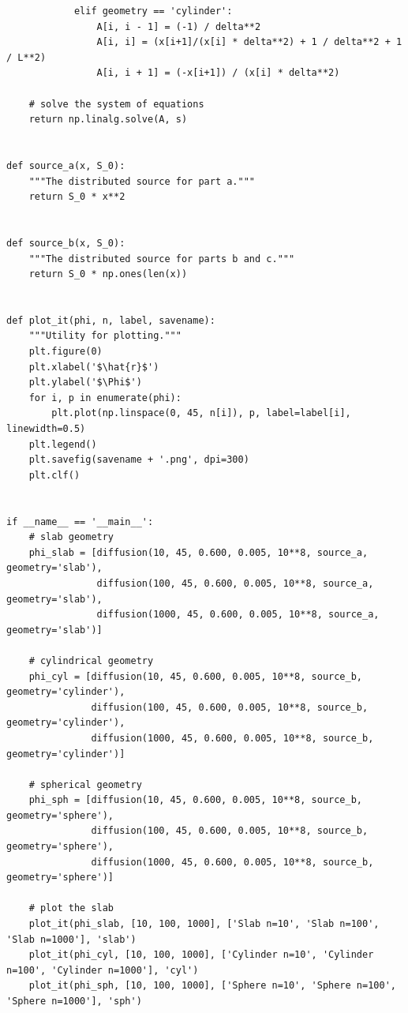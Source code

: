 \documentclass{amsart}
\theoremstyle{definition}
\begin{document}
\begin{verbatim}
            elif geometry == 'cylinder':
                A[i, i - 1] = (-1) / delta**2
                A[i, i] = (x[i+1]/(x[i] * delta**2) + 1 / delta**2 + 1 / L**2)
                A[i, i + 1] = (-x[i+1]) / (x[i] * delta**2)

    # solve the system of equations
    return np.linalg.solve(A, s)


def source_a(x, S_0):
    """The distributed source for part a."""
    return S_0 * x**2


def source_b(x, S_0):
    """The distributed source for parts b and c."""
    return S_0 * np.ones(len(x))


def plot_it(phi, n, label, savename):
    """Utility for plotting."""
    plt.figure(0)
    plt.xlabel('$\hat{r}$')
    plt.ylabel('$\Phi$')
    for i, p in enumerate(phi):
        plt.plot(np.linspace(0, 45, n[i]), p, label=label[i], linewidth=0.5)
    plt.legend()
    plt.savefig(savename + '.png', dpi=300)
    plt.clf()


if __name__ == '__main__':
    # slab geometry
    phi_slab = [diffusion(10, 45, 0.600, 0.005, 10**8, source_a, geometry='slab'),
                diffusion(100, 45, 0.600, 0.005, 10**8, source_a, geometry='slab'),
                diffusion(1000, 45, 0.600, 0.005, 10**8, source_a, geometry='slab')]

    # cylindrical geometry
    phi_cyl = [diffusion(10, 45, 0.600, 0.005, 10**8, source_b, geometry='cylinder'),
               diffusion(100, 45, 0.600, 0.005, 10**8, source_b, geometry='cylinder'),
               diffusion(1000, 45, 0.600, 0.005, 10**8, source_b, geometry='cylinder')]

    # spherical geometry
    phi_sph = [diffusion(10, 45, 0.600, 0.005, 10**8, source_b, geometry='sphere'),
               diffusion(100, 45, 0.600, 0.005, 10**8, source_b, geometry='sphere'),
               diffusion(1000, 45, 0.600, 0.005, 10**8, source_b, geometry='sphere')]

    # plot the slab
    plot_it(phi_slab, [10, 100, 1000], ['Slab n=10', 'Slab n=100', 'Slab n=1000'], 'slab')
    plot_it(phi_cyl, [10, 100, 1000], ['Cylinder n=10', 'Cylinder n=100', 'Cylinder n=1000'], 'cyl')
    plot_it(phi_sph, [10, 100, 1000], ['Sphere n=10', 'Sphere n=100', 'Sphere n=1000'], 'sph')
\end{verbatim}
\end{document}
